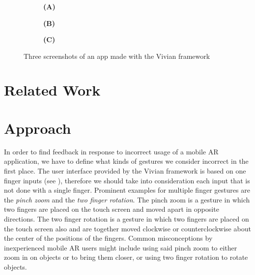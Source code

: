 \documentclass[11pt, a4paper]{article}
\begin{document}
\begin{figure}[H]
			\begin{subfigure}[t]{.32\textwidth}\centering
				\textbf{(A)}
			\end{subfigure}
			\begin{subfigure}[t]{.32\textwidth}\centering
				\textbf{(B)}
			\end{subfigure}
			\begin{subfigure}[t]{.32\textwidth}\centering
				\textbf{(C)}
			\end{subfigure}
			\caption{Three screenshots of an app made with the Vivian framework}
			\label{fig:feedbackonphone}
		\end{figure}

	\section*{Related Work}\label{sec:relatedwork}


	\section*{Approach}\label{sec:approach}
		In order to find feedback in response to incorrect usage of a mobile \ac{AR} application, we have to define what kinds of gestures we consider incorrect in the first place. The user interface provided by the Vivian framework is based on one finger inputs (see ), therefore we should take into consideration each input that is not done with a single finger. Prominent examples for multiple finger gestures are the \emph{pinch zoom} and the \emph{two finger rotation}. The pinch zoom is a gesture in which two fingers are placed on the touch screen and moved apart in opposite directions. The two finger rotation is a gesture in which two fingers are placed on the touch screen also and are together moved clockwise or counterclockwise about the center of the positions of the fingers. Common misconceptions by inexperienced mobile \ac{AR} users might include using said pinch zoom to either zoom in on objects or to bring them closer, or using two finger rotation to rotate objects.
\end{document}
